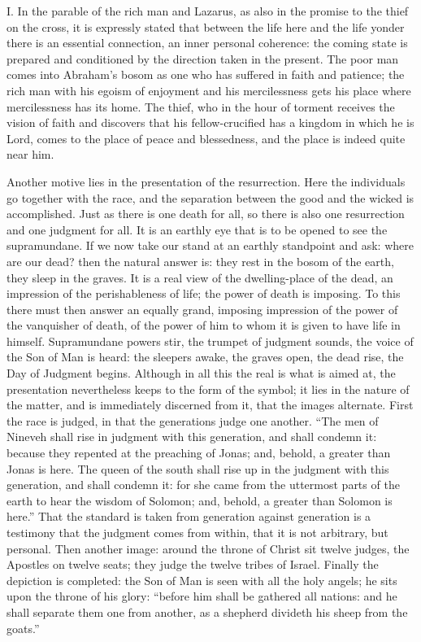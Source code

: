 \documentclass[12pt,a4paper,openany]{book}
\newcommand{\opage}[1]{\marginnote{\footnotesize\textit{[#1]}}}
\begin{document}
I. In the parable of the rich man and Lazarus, as also in the promise to the thief on the cross, it is
\setcounter{footnote}{0}%
\opage{91}expressly stated that between the life here and the life yonder there is an essential connection, an inner
personal coherence: the coming state is prepared and conditioned by the direction taken in the present. The poor man
comes into Abraham's bosom as one who has suffered in faith and patience; the rich man with his egoism of enjoyment and
his mercilessness gets his place where mercilessness has its home. The thief, who in the hour of torment receives the
vision of faith and discovers that his fellow-crucified has a kingdom in which he is Lord, comes to the place of peace
and blessedness, and the place is indeed quite near him.

Another motive lies in the presentation of the resurrection. Here the individuals go together with the race, and the
separation between the good and the wicked is accomplished. Just as there is one death for all, so there is also one
resurrection and one judgment for all. It is an earthly eye that is to be opened to see the supramundane. If we now
take our stand at an earthly standpoint and ask: where are our dead? then the natural answer is: they rest in the bosom
of the earth, they sleep in the graves. It is a real view of the dwelling-place of the dead, an impression of the
perishableness of life; the power of death is imposing. To this there must then answer an equally grand, imposing
impression of the power of the vanquisher of death, of the power of him to whom it is given to have life in himself.
Supramundane powers stir, the trumpet of judgment sounds, the voice of the Son of Man is heard: the sleepers awake, the
graves open, the dead rise, the Day of Judgment begins. Although in all this the real is what is aimed at, the
presentation nevertheless keeps to the form of the symbol; it lies in the nature of the matter, and is immediately
discerned from it, that the images alternate.
\setcounter{footnote}{0}%
\opage{92}First the race is judged, in that the generations judge one another. ``The men of Nineveh shall rise in
judgment with this generation, and shall condemn it: because they repented at the preaching of Jonas; and, behold, a
greater than Jonas is here. The queen of the south shall rise up in the judgment with this generation, and shall
condemn it: for she came from the uttermost parts of the earth to hear the wisdom of Solomon; and, behold, a greater
than Solomon is here.'' That the standard is taken from generation against generation is a testimony that the judgment
comes from within, that it is not arbitrary, but personal. Then another image: around the throne of Christ sit twelve
judges, the Apostles on twelve seats; they judge the twelve tribes of Israel. Finally the depiction is completed: the
Son of Man is seen with all the holy angels; he sits upon the throne of his glory: ``before him shall be gathered all
nations: and he shall separate them one from another, as a shepherd divideth his sheep from the goats.''
\end{document}
